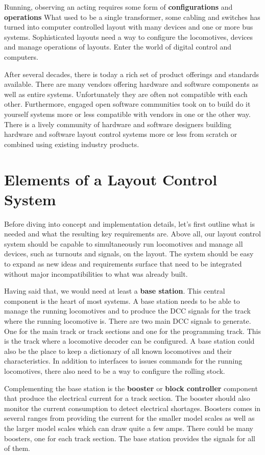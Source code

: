 Running, observing an acting requires some form of {\bf configurations} and {\bf operations} What used to be a single transformer, some cabling and switches has turned into computer controlled layout with many devices and one or more bus systems. Sophisticated layouts need a way to configure the locomotives, devices and manage operations of layouts. Enter the world of digital control and computers.

After several decades, there is today a rich set of product offerings and standards available. There are many vendors offering hardware and software components as well as entire systems. Unfortunately they are often not compatible with each other. Furthermore, engaged open software communities took on to build do it yourself systems more or less compatible with vendors in one or the other way. There is a lively community of hardware and software designers building hardware and software layout control systems more or less from scratch or combined using existing industry products.

\section{Elements of a Layout Control System}

Before diving into concept and implementation details, let's first outline what is needed and what the resulting key requirements are. Above all, our layout control system should be capable to simultaneously run locomotives and manage all devices, such as turnouts and signals, on the layout. The system should be easy to expand as new ideas and requirements surface that need to be integrated without major incompatibilities to what was already built.

Having said that, we would need at least a {\bf base station}. This central component is the heart of most systems. A base station needs to be able to manage the running locomotives and to produce the DCC signals for the track where the running locomotive is. There are two main DCC signals to generate. One for the main track or track sections and one for the programming track. This is the track where a locomotive decoder can be configured. A base station could also be the place to keep a dictionary of all known locomotives and their characteristics. In addition to interfaces to issues commands for the running locomotives, there also need to be a way to configure the rolling stock.

Complementing the base station is the {\bf booster} or {\bf block controller} component that produce the electrical current for a track section. The booster should also monitor the current consumption to detect electrical shortages. Boosters comes in several ranges from providing the current for the smaller model scales as well as the larger model scales which can draw quite a few amps. There could be many boosters, one for each track section. The base station provides the signals for all of them.

